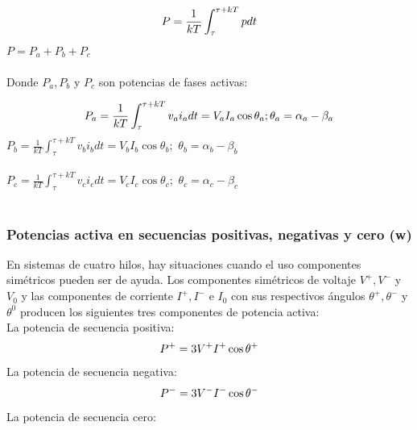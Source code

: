 \begin{equation}\label{EQ42}
P=\frac{1}{kT}\int_{\tau}^{\tau +kT}pdt\\
\end{equation}
$P=P_{a}+P_{b}+P_{c}$\\\\

Donde $P_{a},P_{b}$ y $P_{c}$ son potencias de fases activas:

\begin{equation}\label{EQ43}
P_{a}=\frac{1}{kT}\int_{\tau}^{\tau +kT}v_{a}i_{a}dt=V_{a}I_{a}\cos\theta_{a};\\ \theta_{a}=\alpha_{a}-\beta_{a}\\
\end{equation}
$P_{b}=\frac{1}{kT}\int_{\tau}^{\tau +kT}v_{b}i_{b}dt=V_{b}I_{b}\cos\theta_{b};$ \hspace{1.5cm} $\theta_{b}=\alpha_{b}-\beta_{b}$\\\\
$P_{c}=\frac{1}{kT}\int_{\tau}^{\tau +kT}v_{c}i_{c}dt=V_{c}I_{c}\cos\theta_{c};$ \hspace{1.5cm} $\theta_{c}=\alpha_{c}-\beta_{c}$\\\\


\subsubsection{Potencias activa en secuencias positivas, negativas y cero (w)}

En sistemas de cuatro hilos, hay situaciones cuando el uso componentes simétricos pueden ser de ayuda. Los componentes simétricos de voltaje $V^{+},V^{-}$ y $V_{0}$ y las componentes de corriente $I^{+},I^{-}$  e $I_{0}$ con sus respectivos ángulos $\theta^{+},\theta^{-}$ y $\theta^{0}$ producen los siguientes tres componentes de potencia activa:\cite{A30}\\

La potencia de secuencia positiva:\\


\begin{equation}\label{EQ44}
P^+=3V^{+}I^{+}\cos\theta^{+}\\
\end{equation} 
La potencia de secuencia negativa:\\


\begin{equation}\label{EQ45}
P^-=3V^{-}I^{-}\cos\theta^{-}\\
\end{equation} 
La potencia de secuencia cero:\\


